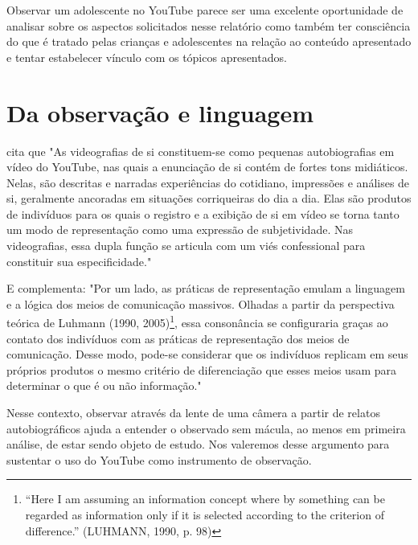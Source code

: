 Observar um adolescente no YouTube parece ser uma excelente oportunidade de analisar sobre os aspectos solicitados nesse relatório como também ter consciência do que é tratado pelas crianças e adolescentes na relação ao conteúdo apresentado e tentar estabelecer vínculo com os tópicos apresentados.



\section{Da observação e linguagem}

 cita que "As videografias de si constituem-se como pequenas autobiografias em vídeo do YouTube, nas quais a enunciação de si contém de fortes tons midiáticos. Nelas, são descritas e narradas experiências do cotidiano, impressões e análises de si, geralmente ancoradas em situações corriqueiras do dia a dia. Elas são produtos de indivíduos para os quais o registro e a exibição de si em vídeo se torna tanto um modo de representação como uma expressão de subjetividade. Nas videografias, essa dupla função se articula com um viés confessional para constituir sua especificidade."

E complementa: "Por um lado, as práticas de representação emulam a linguagem e a lógica dos meios de comunicação massivos. Olhadas a partir da perspectiva teórica de Luhmann (1990, 2005)\footnote{“Here I am assuming an information concept where by something can be regarded as information only if it is selected according to the criterion of difference.” (LUHMANN, 1990, p. 98)}, essa consonância se configuraria graças ao contato dos indivíduos com as práticas de representação dos meios de comunicação. Desse modo, pode-se considerar que os indivíduos replicam em seus próprios produtos o mesmo critério de diferenciação que esses meios usam para determinar o que é ou não informação."

Nesse contexto, observar através da lente de uma câmera a partir de relatos autobiográficos ajuda a entender o observado sem mácula, ao menos em primeira análise, de estar sendo objeto de estudo. Nos valeremos desse argumento para sustentar o uso do YouTube como instrumento de observação.



